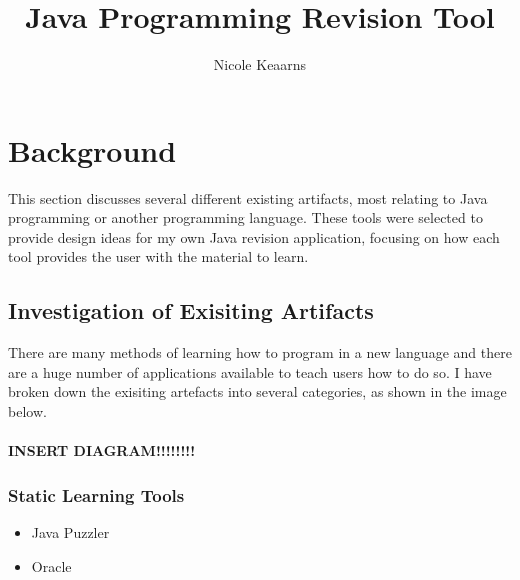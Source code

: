 \documentclass{article}
\begin{document}
\title{Java Programming Revision Tool}
\author{Nicole Keaarns}
\maketitle
\tableofcontents

\newpage

\section{Background}

This section discusses several different existing artifacts, most relating to Java programming or another programming language. These tools were selected to provide design ideas for my own Java revision application, focusing on how each tool provides the user with the material to learn.

\subsection{Investigation of Exisiting Artifacts}

There are many methods of learning how to program in a new language and there are a huge number of applications available to teach users how to do so. I have broken down the exisiting artefacts into several categories, as shown in the image below.\\
\\
\textbf{INSERT DIAGRAM!!!!!!!!}


\subsubsection{Static Learning Tools}

\begin{itemize}
\item Java Puzzler
\item Oracle
\end{itemize}
\end{document}
